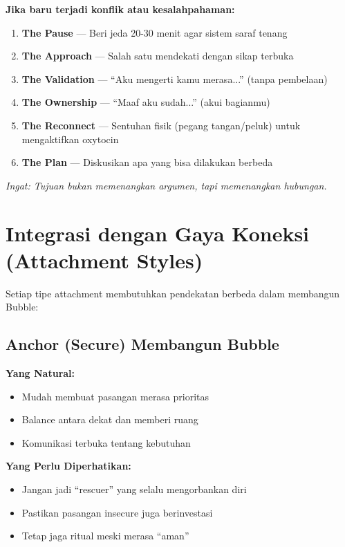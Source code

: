 \begin{tipbox}
\textbf{Jika baru terjadi konflik atau kesalahpahaman:}

\begin{enumerate}
    \item \textbf{The Pause} --- Beri jeda 20-30 menit agar sistem saraf tenang
    \item \textbf{The Approach} --- Salah satu mendekati dengan sikap terbuka
    \item \textbf{The Validation} --- ``Aku mengerti kamu merasa...'' (tanpa pembelaan)
    \item \textbf{The Ownership} --- ``Maaf aku sudah...'' (akui bagianmu)
    \item \textbf{The Reconnect} --- Sentuhan fisik (pegang tangan/peluk) untuk mengaktifkan oxytocin
    \item \textbf{The Plan} --- Diskusikan apa yang bisa dilakukan berbeda
\end{enumerate}

\textit{Ingat: Tujuan bukan memenangkan argumen, tapi memenangkan hubungan.}
\end{tipbox}

\section{Integrasi dengan Gaya Koneksi (Attachment Styles)}

Setiap tipe attachment membutuhkan pendekatan berbeda dalam membangun Bubble:

\subsection{Anchor (Secure) Membangun Bubble}

\begin{praktikbox}
\textbf{Yang Natural:}
\begin{itemize}
    \item Mudah membuat pasangan merasa prioritas
    \item Balance antara dekat dan memberi ruang
    \item Komunikasi terbuka tentang kebutuhan
\end{itemize}

\textbf{Yang Perlu Diperhatikan:}
\begin{itemize}
    \item Jangan jadi ``rescuer'' yang selalu mengorbankan diri
    \item Pastikan pasangan insecure juga berinvestasi
    \item Tetap jaga ritual meski merasa ``aman''
\end{itemize}
\end{praktikbox}

